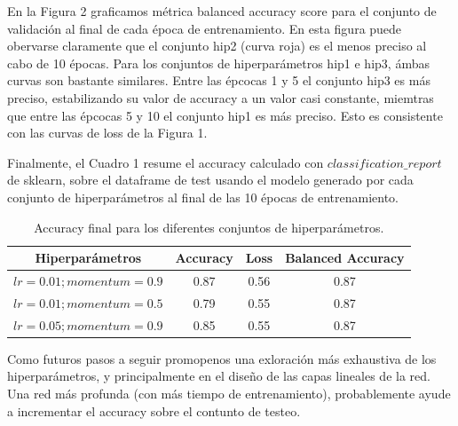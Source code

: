 \documentclass[a4paper,10pt]{article}
\begin{document}
En la Figura 2 graficamos métrica balanced accuracy score para el conjunto de validación al final de cada época de entrenamiento. En esta figura puede obervarse claramente que el conjunto hip2 (curva roja) es el menos preciso al cabo de 10 épocas. Para los conjuntos de hiperparámetros hip1 e hip3, ámbas curvas son bastante similares. Entre las épcocas 
1 y 5 el conjunto hip3 es más preciso, estabilizando su valor de accuracy a un valor casi constante, miemtras que entre las épcocas 5 y 10 el conjunto hip1 es más preciso. Esto es consistente con las curvas de loss de la Figura 1.

Finalmente, el Cuadro 1 resume el accuracy calculado con $classification\_report$ de sklearn, sobre el dataframe de test usando el modelo generado por cada conjunto de hiperparámetros al final de las 10 épocas de entrenamiento.
\begin{table}[h]
\caption{Accuracy final para los diferentes conjuntos de hiperparámetros.}\label{tab:data}
\begin{tabular}{cccc}
\hline
Hiperparámetros  & Accuracy & Loss & Balanced Accuracy\\
\hline
\hline
$lr=0.01; momentum=0.9$ &  0.87 & 0.56 & 0.87 \\
$lr=0.01; momentum=0.5$ &  0.79 & 0.55 & 0.87 \\
$lr=0.05; momentum=0.9$ &  0.85 & 0.55 & 0.87 
\end{tabular}
\end{table}

Como futuros pasos a seguir promopenos una exloración más exhaustiva de los hiperparámetros, y principalmente en el diseño de las capas lineales de la red. Una red más profunda (con más tiempo de entrenamiento), probablemente ayude a incrementar el accuracy sobre el contunto de testeo.
\end{document}
